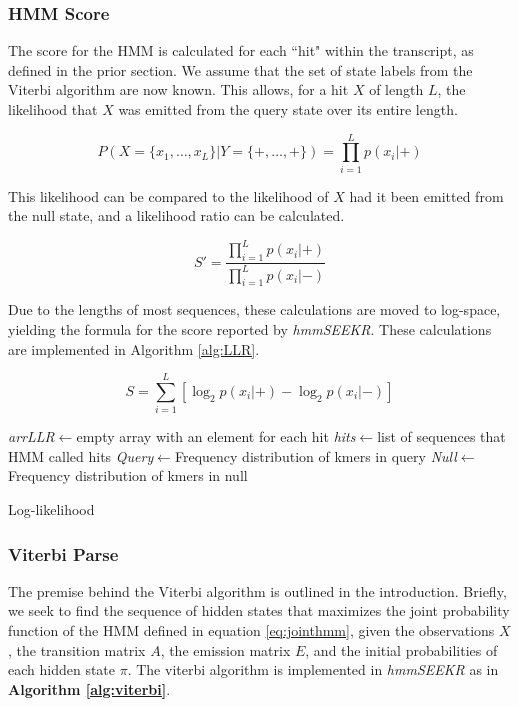 \subsubsection{HMM Score}
The score for the HMM is calculated for each ``hit" within the transcript, as defined in the prior section. We assume that the set of state labels from the Viterbi algorithm are now known. This allows, for a hit $X$ of length $L$, the likelihood that $X$ was emitted from the query state over its entire length. 

$$P(X=\{x_1,\dots,x_L\} | Y = \{+,\dots,+\}) = \prod_{i=1}^L{p(x_i|+)}$$

This likelihood can be compared to the likelihood of $X$ had it been emitted from the null state, and a likelihood ratio can be calculated.

$$S' = \frac{\prod_{i=1}^L{p(x_i|+)}}{\prod_{i=1}^Lp(x_i|-)}$$

Due to the lengths of most sequences, these calculations are moved to log-space, yielding the formula for the score reported by \emph{hmmSEEKR}. These calculations are implemented in Algorithm \ref{alg:LLR}.

$$S = \sum_{i=1}^L{\left[\log_2 p(x_i|+)- \log_2 p(x_i|-)\right]}$$
\begin{algorithm}[h]
\DontPrintSemicolon
{}
\SetAlgoLined
\emph{arrLLR}$\leftarrow$empty array with an element for each hit\;
\emph{hits}$\leftarrow$list of sequences that HMM called hits\;
\emph{Query}$\leftarrow$Frequency distribution of kmers in query\;
\emph{Null}$\leftarrow$Frequency distribution of kmers in null\;

 \caption{Log-likelihood}
 \label{alg:LLR}
\end{algorithm}

\subsubsection{Viterbi Parse}

The premise behind the Viterbi algorithm is outlined in the introduction. Briefly, we seek to find the sequence of hidden states that maximizes the joint probability function of the HMM defined in equation \ref{eq:jointhmm}, given the observations $X$, the transition matrix $A$, the emission matrix $E$, and the initial probabilities of each hidden state $\pi$. The viterbi algorithm is implemented in \emph{hmmSEEKR} as in \textbf{Algorithm \ref{alg:viterbi}}.

